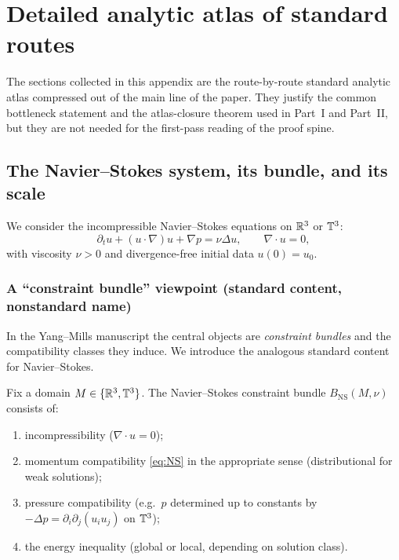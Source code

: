 \clearpage
\section{Detailed analytic atlas of standard routes}

The sections collected in this appendix are the route-by-route standard analytic atlas compressed out
of the main line of the paper. They justify the common bottleneck statement and the
atlas-closure theorem used in Part~I and Part~II, but they are not needed for the first-pass reading of
the proof spine.

\subsection{The Navier--Stokes system, its bundle, and its scale}
We consider the incompressible Navier--Stokes equations on $\mathbb{R}^3$ or $\mathbb{T}^3$:
\begin{equation}\label{eq:NS}
\partial_t u + (u\cdot\nabla)u + \nabla p = \nu \Delta u,\qquad \nabla\cdot u = 0,
\end{equation}
with viscosity $\nu>0$ and divergence-free initial data $u(0)=u_0$.

\subsubsection{A ``constraint bundle'' viewpoint (standard content, nonstandard name)}
In the Yang--Mills manuscript the central objects are \emph{constraint bundles} and the
compatibility classes they induce. We introduce the analogous standard content for Navier--Stokes.

\begin{definition}\label{def:NS-bundle}
Fix a domain $M\in\{\mathbb{R}^3,\mathbb{T}^3\}$. The Navier--Stokes constraint bundle $B_{\mathrm{NS}}(M,\nu)$
consists of:
\begin{enumerate}[label=(\roman*), leftmargin=2.1em]
\item incompressibility ($\nabla\cdot u=0$);
\item momentum compatibility \eqref{eq:NS} in the appropriate sense (distributional for weak solutions);
\item pressure compatibility (e.g.\ $p$ determined up to constants by $-\Delta p=\partial_i\partial_j(u_i u_j)$ on $\mathbb{T}^3$);
\item the energy inequality (global or local, depending on solution class).
\end{enumerate}
\end{definition}


